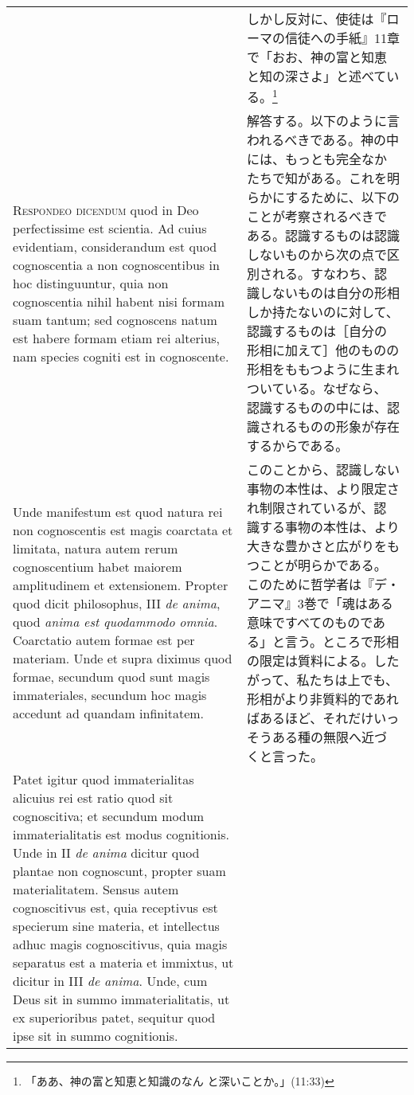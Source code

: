 \documentclass[10pt]{jsarticle} %
\begin{document}
\begin{longtable}{p{21em}p{21em}}
&

しかし反対に、使徒は『ローマの信徒への手紙』11章で「おお、神の富と知恵
と知の深さよ」と述べている。\footnote{「ああ、神の富と知恵と知識のなん
と深いことか。」(11:33)}

\\

{\scshape Respondeo dicendum} quod in Deo perfectissime est
scientia. Ad cuius evidentiam, considerandum est quod cognoscentia a
non cognoscentibus in hoc distinguuntur, quia non cognoscentia nihil
habent nisi formam suam tantum; sed cognoscens natum est habere formam
etiam rei alterius, nam species cogniti est in cognoscente.

&

解答する。以下のように言われるべきである。神の中には、もっとも完全なか
たちで知がある。これを明らかにするために、以下のことが考察されるべきで
ある。認識するものは認識しないものから次の点で区別される。すなわち、認
識しないものは自分の形相しか持たないのに対して、認識するものは［自分の
形相に加えて］他のものの形相をももつように生まれついている。なぜなら、
認識するものの中には、認識されるものの形象が存在するからである。

\\

Unde manifestum est quod natura rei non cognoscentis est magis
coarctata et limitata, natura autem rerum cognoscentium habet maiorem
amplitudinem et extensionem. Propter quod dicit philosophus, III
{\itshape de anima}, quod {\itshape anima est quodammodo
omnia}. Coarctatio autem formae est per materiam. Unde et supra
diximus quod formae, secundum quod sunt magis immateriales, secundum
hoc magis accedunt ad quandam infinitatem.

&

このことから、認識しない事物の本性は、より限定され制限されているが、認
識する事物の本性は、より大きな豊かさと広がりをもつことが明らかである。
このために哲学者は『デ・アニマ』3巻で「魂はある意味ですべてのものであ
る」と言う。ところで形相の限定は質料による。したがって、私たちは上でも、
形相がより非質料的であればあるほど、それだけいっそうある種の無限へ近づ
くと言った。

\\

Patet igitur quod immaterialitas alicuius rei est ratio quod sit
cognoscitiva; et secundum modum immaterialitatis est modus
cognitionis. Unde in II {\itshape de anima} dicitur quod plantae non
cognoscunt, propter suam materialitatem. Sensus autem cognoscitivus
est, quia receptivus est specierum sine materia, et intellectus adhuc
magis cognoscitivus, quia magis separatus est a materia et immixtus,
ut dicitur in III {\itshape de anima}. Unde, cum Deus sit in summo
immaterialitatis, ut ex superioribus patet, sequitur quod ipse sit in
summo cognitionis.


\end{longtable}
\end{document}

